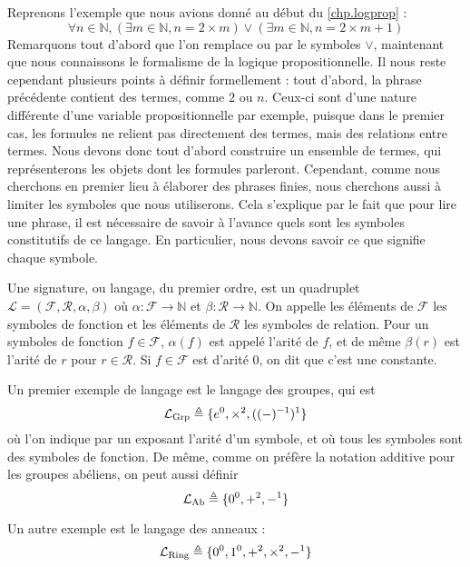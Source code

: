 Reprenons l'exemple que nous avions donné au début du \cref{chp.logprop} :
\[\forall n \in \mathbb N, (\exists m \in \mathbb N, n = 2\times m) \lor
(\exists m \in \mathbb N, n = 2 \times m + 1)\]
Remarquons tout d'abord que l'on remplace \og ou\fg{} par le symboles $\lor$,
maintenant que nous connaissons le formalisme de la logique propositionnelle.
Il nous reste cependant plusieurs points à définir formellement : tout d'abord,
la phrase précédente contient des termes, comme $2$ ou $n$. Ceux-ci sont d'une
nature différente d'une variable propositionnelle par exemple, puisque dans le
premier cas, les formules ne relient pas directement des termes, mais des
relations entre termes. Nous devons donc tout d'abord construire un ensemble de
termes, qui représenterons les objets dont les formules parleront. Cependant,
comme nous cherchons en premier lieu à élaborer des phrases finies, nous
cherchons aussi à limiter les symboles que nous utiliserons. Cela s'explique par
le fait que pour lire une phrase, il est nécessaire de savoir à l'avance quels
sont les symboles constitutifs de ce langage. En particulier, nous devons savoir
ce que signifie chaque symbole.

\begin{definition}[Signature]
  Une signature, ou langage, du premier ordre, est un quadruplet $\mathcal L =
  (\mathcal F,\mathcal R, \alpha,\beta)$ où $\alpha : \mathcal F \to \mathbb N$
  et $\beta : \mathcal R \to \mathbb N$. On appelle les éléments de $\mathcal F$
  les symboles de fonction et les éléments de $\mathcal R$ les symboles de
  relation. Pour un symboles de fonction $f\in\mathcal F$, $\alpha(f)$ est appelé
  l'arité de $f$, et de même $\beta(r)$ est l'arité de $r$ pour $r\in\mathcal R$.
  Si $f\in\mathcal F$ est d'arité $0$, on dit que c'est une constante.
\end{definition}

\begin{example}
  Un premier exemple de langage est le langage des groupes, qui est
  \[\mathcal L_{\mathrm{Grp}} \triangleq \{e^0,\times^2,((-)^{-1})^1\}\]
  où l'on indique par un exposant l'arité d'un symbole, et où tous les symboles
  sont des symboles de fonction. De même, comme on préfère la notation additive
  pour les groupes abéliens, on peut aussi définir
  \[\mathcal L_{\mathrm{Ab}} \triangleq \{0^0,+^2,-^1\}\]
\end{example}

\begin{example}
  Un autre exemple est le langage des anneaux :
  \[\mathcal L_{\mathrm{Ring}}\triangleq \{0^0,1^0,+^2,\times^2,-^1\}\]
\end{example}

